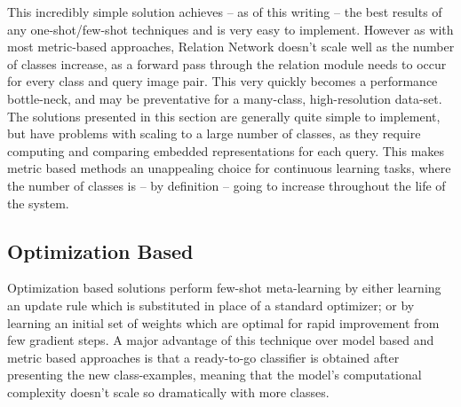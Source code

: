 \documentclass{report}
\begin{document}
This incredibly simple solution achieves -- as of this writing -- the best results of any one-shot/few-shot techniques and is very easy to implement. However as with most metric-based approaches, Relation Network doesn't scale well as the number of classes increase, as a forward pass through the relation module needs to occur for every class and query image pair. This very quickly becomes a performance bottle-neck, and may be preventative for a many-class, high-resolution data-set. \newline \newline
The solutions presented in this section are generally quite simple to implement, but have problems with scaling to a large number of classes, as they require computing and comparing embedded representations for each query. This makes metric based methods an unappealing choice for continuous learning tasks, where the number of classes is -- by definition -- going to increase throughout the life of the system. \par

\subsection{Optimization Based} \label{related-meta-opt:1}
Optimization based solutions perform few-shot meta-learning by either learning an update rule which is substituted in place of a standard optimizer; or by learning an initial set of weights which are optimal for rapid improvement from few gradient steps. A major advantage of this technique over model based and metric based approaches is that a ready-to-go classifier is obtained after presenting the new class-examples, meaning that the model's computational complexity doesn't scale so dramatically with more classes. \par
\end{document}
